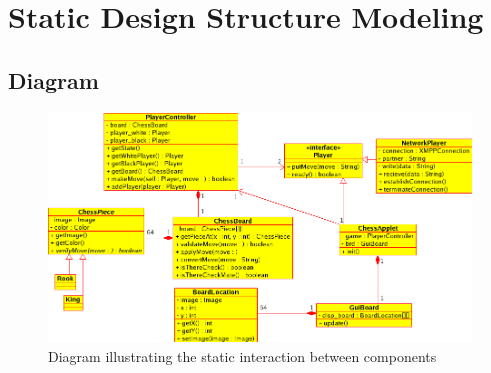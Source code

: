 \section{Static Design Structure Modeling}

\subsection{Diagram}
\begin{figure}[H]
   \centering
   \includegraphics[scale=0.5]{cdiagram.png}
   \caption{Diagram illustrating the static interaction between components}
  \end{figure}

